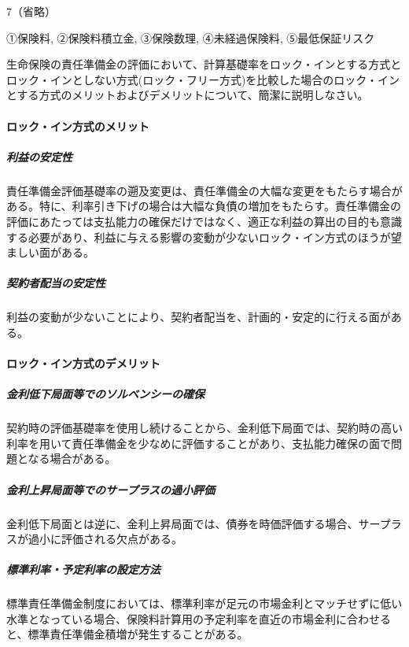 \documentclass[report,gutter=10mm,fore-edge=10mm,uplatex,dvipdfmx]{jlreq}
\begin{document}
7（省略）



①保険料, ②保険料積立金, ③保険数理, ④未経過保険料, ⑤最低保証リスク


生命保険の責任準備金の評価において、計算基礎率をロック・インとする方式とロック・インとしない方式(ロック・フリー方式)を比較した場合のロック・インとする方式のメリットおよびデメリットについて、簡潔に説明しなさい。


\paragraph{ロック・イン方式のメリット}

\subparagraph{利益の安定性}

責任準備金評価基礎率の遡及変更は、責任準備金の大幅な変更をもたらす場合がある。特に、利率引き下げの場合は大幅な負債の増加をもたらす。責任準備金の評価にあたっては支払能力の確保だけではなく、適正な利益の算出の目的も意識する必要があり、利益に与える影響の変動が少ないロック・イン方式のほうが望ましい面がある。

\subparagraph{契約者配当の安定性}

利益の変動が少ないことにより、契約者配当を、計画的・安定的に行える面がある。

\paragraph{ロック・イン方式のデメリット}

\subparagraph{金利低下局面等でのソルベンシーの確保}

契約時の評価基礎率を使用し続けることから、金利低下局面では、契約時の高い利率を用いて責任準備金を少なめに評価することがあり、支払能力確保の面で問題となる場合がある。

\subparagraph{金利上昇局面等でのサープラスの過小評価}

金利低下局面とは逆に、金利上昇局面では、債券を時価評価する場合、サープラスが過小に評価される欠点がある。

\subparagraph{標準利率・予定利率の設定方法}

標準責任準備金制度においては、標準利率が足元の市場金利とマッチせずに低い水準となっている場合、保険料計算用の予定利率を直近の市場金利に合わせると、標準責任準備金積増が発生することがある。
\end{document}
